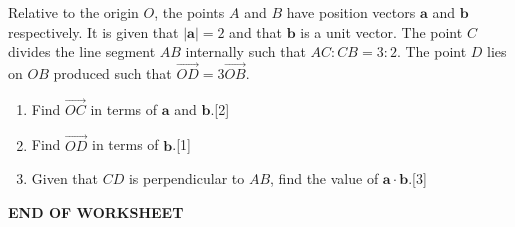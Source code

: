 \documentclass[a4paper,11pt,oneside]{book}
\newcounter{wq}[section]
\newcommand{\Q}[1]{\par\needspace{5\baselineskip}\medskip\stepcounter{wq}\noindent\textbf{\thewq}\quad #1\par}
\begin{document}
\Q{Relative to the origin $O$, the points $A$ and $B$ have position vectors $\mathbf a$ and $\mathbf b$ respectively. It is given that $|\mathbf a|=2$ and that $\mathbf b$ is a unit vector. The point $C$ divides the line segment $AB$ internally such that $AC:CB=3:2$. The point $D$ lies on $OB$ produced such that $\overrightarrow{OD}=3\overrightarrow{OB}$.\begin{enumerate}[label=\textbf{(\alph*)},leftmargin=2.2em,itemsep=3pt]\item Find $\overrightarrow{OC}$ in terms of $\mathbf a$ and $\mathbf b$.\hfill[2]\item Find $\overrightarrow{OD}$ in terms of $\mathbf b$.\hfill[1]\item Given that $CD$ is perpendicular to $AB$, find the value of $\mathbf a\cdot\mathbf b$.\hfill[3]\end{enumerate}}
\par\vspace{\baselineskip}\begin{center}\textbf{END OF WORKSHEET}\end{center}
\end{document}

